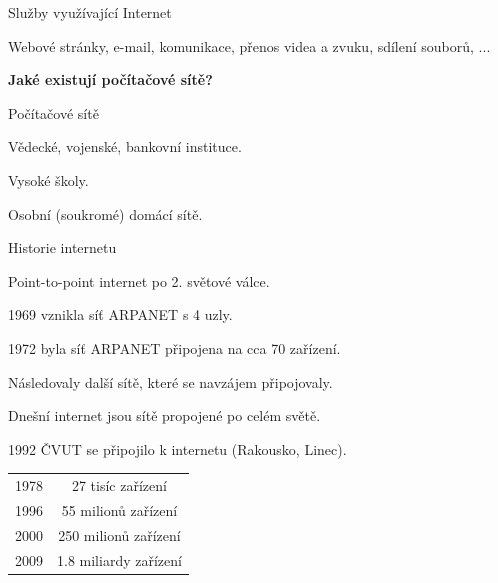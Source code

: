 \documentclass[aspectratio=169]{beamer}
\begin{document}
\begin{frame}{Služby využívající Internet}
    \begin{cardTiny}
        \begin{center}
            Webové stránky, e-mail, komunikace, přenos videa a zvuku, sdílení souborů, ...
        \end{center}
    \end{cardTiny}
    \begin{cardTiny}
        \begin{flushleft}
        \begin{center}
            \textbf{Jaké existují počítačové sítě?}
        \end{center}
        \end{flushleft}
    \end{cardTiny}
\end{frame}

\begin{frame}{Počítačové sítě}
    \begin{cardTiny}
        \begin{center}
            Vědecké, vojenské, bankovní instituce.

            Vysoké školy.

            Osobní (soukromé) domácí sítě.
        \end{center}
    \end{cardTiny}
\end{frame}

\begin{frame}{Historie internetu}
    \begin{cardTiny}
        \begin{flushleft}
            Point-to-point internet po 2. světové válce.

            1969 vznikla síť ARPANET s 4 uzly.

            1972 byla síť ARPANET připojena na cca 70 zařízení.

            Následovaly další sítě, které se navzájem připojovaly.

            Dnešní internet jsou sítě propojené po celém světě.

            1992 ČVUT se připojilo k internetu (Rakousko, Linec).
        \end{flushleft}
    \end{cardTiny}
    \begin{cardTiny}
        \begin{center}
            \begin{tabular}{ |c|c| } 
                \hline
                1978 & 27 tisíc zařízení        \\
                1996 & 55 milionů zařízení      \\
                2000 & 250 milionů zařízení     \\
                2009 & 1.8 miliardy zařízení    \\
                \hline
            \end{tabular}
        \end{center}
    \end{cardTiny}
\end{frame}
\end{document}
